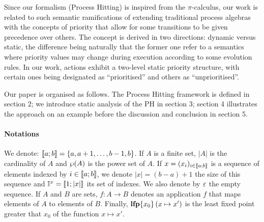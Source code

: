 Since our formalism (Process Hitting) is inspired from the $\pi$-calculus, our work is related to such semantic ramifications of extending traditional process algebras with the concepts of priority that allow for some transitions to be given precedence over others.
The concept is derived in two directions: dynamic versus static, the difference being naturally that the former one refer to a semantics where priority values may change during execution according to some evolution rules.
In our work, actions exhibit a two-level static priority structure, with certain ones being designated as “prioritised” and others as “unprioritised”.

Our paper is organised as follows.
The Process Hitting framework is defined in section 2;
we introduce static analysis of the PH in section 3;
section 4 illustrates the approach on an example
before the discussion and conclusion in section 5. 



\paragraph*{Notations}
We denote: $\llbracket a; b \rrbracket = \{ a, a+1, \dots, b-1, b \}$.
If $A$ is a finite set,
$|A|$ is the cardinality of $A$
and $\wp(A)$ is the power set of $A$.
If $x = (x_i)_{i \in \llbracket a; b \rrbracket}$ is a sequence of elements indexed by $i \in \llbracket a; b \rrbracket$,
we denote $|x| = (b-a)+1$ the size of this sequence
and $\mathbb{I}^{x} = \llbracket 1; |x| \rrbracket$ its set of indexes.
We also denote by $\varepsilon$ the empty sequence.
If $A$ and $B$ are sets,
$f : A \rightarrow B$ denotes an application $f$ that maps elements of $A$ to elements of $B$.
Finally, $\mathbf{lfp}\{x_0\}\left(x\mapsto x'\right)$ is the least fixed point greater that $x_0$ of the function $x \mapsto x'$.